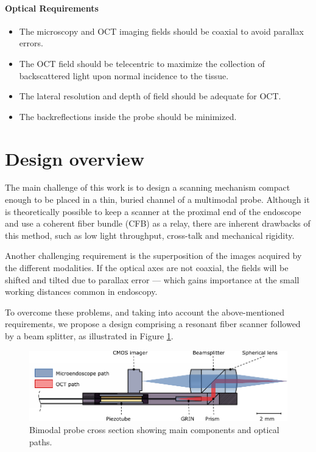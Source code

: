 \paragraph{Optical Requirements}

\begin{itemize}
\item The microscopy and OCT imaging fields should be coaxial to avoid parallax errors. 
\item The OCT field should be telecentric to maximize the collection of backscattered light upon normal incidence to the tissue.
\item The lateral resolution and depth of field should be adequate for OCT.
\item The backreflections inside the probe should be minimized.
\end{itemize}

  

\section{Design overview}

The main challenge of this work is to design a scanning mechanism compact enough to be placed in a thin, buried channel of a multimodal probe. 
Although it is theoretically possible to keep a scanner at the proximal end of the endoscope and use a coherent fiber bundle (CFB) as a relay, there are inherent drawbacks of this method, such as low light throughput, cross-talk and mechanical rigidity. 

Another challenging requirement is the superposition of the images acquired by the different modalities. If the optical axes are not coaxial, the fields will be shifted and tilted due to parallax error --- which gains importance at the small working distances common in endoscopy.

To overcome these problems, and taking into account the above-mentioned requirements, we propose a design comprising a resonant fiber scanner followed by a beam splitter, as illustrated in Figure \ref{fig:bimodalSketch}.

\begin{figure}[h!]\centering
      \includegraphics{figures/10_Introduction/bimodalSketch/out.pdf}
      \caption{Bimodal probe cross section showing main components and optical paths.}
      \label{fig:bimodalSketch}
\end{figure}

